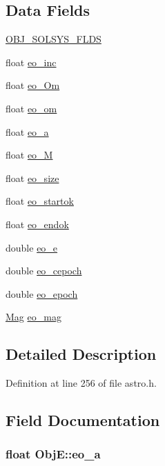 \subsection*{Data Fields}
\begin{DoxyCompactItemize}
\item 
\hyperlink{struct_obj_e_a99f83e9c2a725f3ac18aa4fa6a78b4c6}{O\-B\-J\-\_\-\-S\-O\-L\-S\-Y\-S\-\_\-\-F\-L\-D\-S}
\item 
float \hyperlink{struct_obj_e_ae56287dddc0ff0cee17a0c320cb231c4}{eo\-\_\-inc}
\item 
float \hyperlink{struct_obj_e_a705d0e32e827fb82f140f44259192a1d}{eo\-\_\-\-Om}
\item 
float \hyperlink{struct_obj_e_a141d2d2f867c980b6659d2107929503a}{eo\-\_\-om}
\item 
float \hyperlink{struct_obj_e_ac41c81ba9ecc8a7c26a386322dea5f55}{eo\-\_\-a}
\item 
float \hyperlink{struct_obj_e_abf1b3b9093196f05339af6b2c103b452}{eo\-\_\-\-M}
\item 
float \hyperlink{struct_obj_e_aa2b3a65ada0f743f8b09ef8794298fe7}{eo\-\_\-size}
\item 
float \hyperlink{struct_obj_e_a645f746b4ddffb8d9d4413bde196a12a}{eo\-\_\-startok}
\item 
float \hyperlink{struct_obj_e_a32f5f29577591f4c0565f678e2564062}{eo\-\_\-endok}
\item 
double \hyperlink{struct_obj_e_a0405fd0f0db7d32fa17673b2e7310739}{eo\-\_\-e}
\item 
double \hyperlink{struct_obj_e_a2b47b1a9a359291e845e24d6fdd0b389}{eo\-\_\-cepoch}
\item 
double \hyperlink{struct_obj_e_a616f7a6b3e8f5be54b889ed4127f51e4}{eo\-\_\-epoch}
\item 
\hyperlink{struct_mag}{Mag} \hyperlink{struct_obj_e_af226a2ba02b4f5af8848bbcf601272bc}{eo\-\_\-mag}
\end{DoxyCompactItemize}


\subsection{Detailed Description}


Definition at line 256 of file astro.\-h.



\subsection{Field Documentation}
\hypertarget{struct_obj_e_ac41c81ba9ecc8a7c26a386322dea5f55}{
\subsubsection[{eo\-\_\-a}]{\setlength{\rightskip}{0pt plus 5cm}float Obj\-E\-::eo\-\_\-a}}\label{struct_obj_e_ac41c81ba9ecc8a7c26a386322dea5f55}


